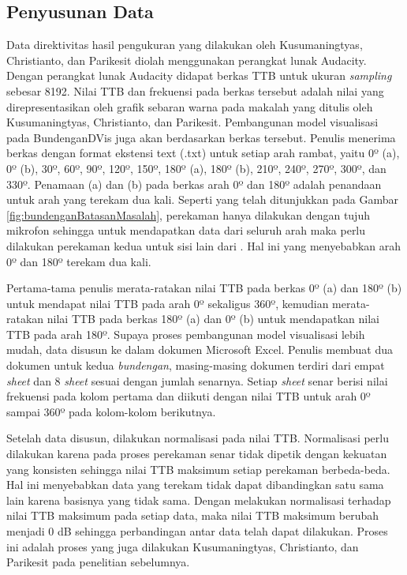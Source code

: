 \subsection{Penyusunan Data}
Data direktivitas \bundengan hasil pengukuran yang dilakukan oleh Kusumaningtyas, Christianto, dan Parikesit diolah menggunakan perangkat lunak Audacity. Dengan perangkat lunak Audacity didapat berkas TTB untuk ukuran \emph{sampling} sebesar 8192. Nilai TTB dan frekuensi pada berkas tersebut adalah nilai yang direpresentasikan oleh grafik sebaran warna pada makalah yang ditulis oleh Kusumaningtyas, Christianto, dan Parikesit. Pembangunan model visualisasi pada BundenganDVis juga akan berdasarkan berkas tersebut. Penulis menerima berkas dengan format ekstensi text (.txt) untuk setiap arah rambat, yaitu 0º (a), 0º (b), 30º, 60º, 90º, 120º, 150º, 180º (a), 180º (b), 210º, 240º, 270º, 300º, dan 330º. Penamaan (a) dan (b) pada berkas arah 0º dan 180º adalah penandaan untuk arah yang terekam dua kali. Seperti yang telah ditunjukkan pada Gambar \ref{fig:bundenganBatasanMasalah}, perekaman hanya dilakukan dengan tujuh mikrofon sehingga untuk mendapatkan data dari seluruh arah maka perlu dilakukan perekaman kedua untuk sisi lain dari \bundengan. Hal ini yang menyebabkan arah 0º dan 180º terekam dua kali. \par 

Pertama-tama penulis merata-ratakan nilai TTB pada berkas 0º (a) dan 180º (b) untuk mendapat nilai TTB pada arah 0º sekaligus 360º, kemudian merata-ratakan nilai TTB pada berkas 180º (a) dan 0º (b) untuk mendapatkan nilai TTB pada arah 180º. Supaya proses pembangunan model visualisasi lebih mudah, data disusun ke dalam dokumen Microsoft Excel. Penulis membuat dua dokumen untuk kedua \emph{bundengan}, masing-masing dokumen terdiri dari empat \emph{sheet} dan 8 \emph{sheet} sesuai dengan jumlah senarnya. Setiap \emph{sheet} senar berisi nilai frekuensi pada kolom pertama dan diikuti dengan nilai TTB untuk arah 0º sampai 360º pada kolom-kolom berikutnya. \par 

Setelah data disusun, dilakukan normalisasi pada nilai TTB. Normalisasi perlu dilakukan karena pada proses perekaman senar tidak dipetik dengan kekuatan yang konsisten sehingga nilai TTB maksimum setiap perekaman berbeda-beda. Hal ini menyebabkan data yang terekam tidak dapat dibandingkan satu sama lain karena basisnya yang tidak sama. Dengan melakukan normalisasi terhadap nilai TTB maksimum pada setiap data, maka nilai TTB maksimum berubah menjadi 0 dB sehingga perbandingan antar data telah dapat dilakukan. Proses ini adalah proses yang juga dilakukan Kusumaningtyas, Christianto, dan Parikesit pada penelitian sebelumnya. \par 


